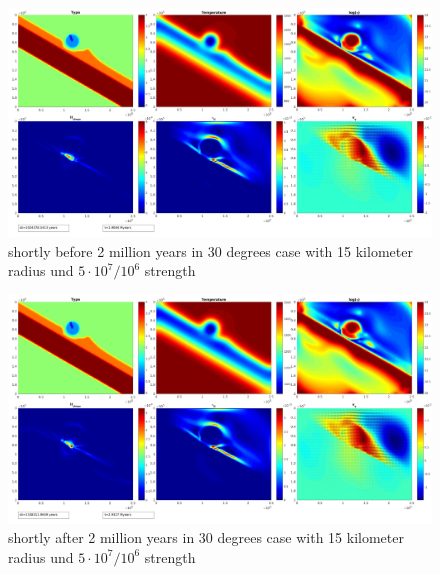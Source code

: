 \documentclass[12pt]{scrreprt}
\begin{document}
\begin{figure}[!ht]
\begin{minipage}[t]{1.0\textwidth}
\includegraphics[width=1.0\textwidth]{./Snapshots/bulldozer/posleft30/Subductionzonewithblob38posleft3slab30s5e7s1e6r15.jpg}
\end{minipage}
\caption{shortly before 2 million years in 30 degrees case with 15 kilometer radius und $5 \cdot10^7/10^6$ strength}
\label{fig:goodmatch1}
\end{figure}

\begin{figure}[!ht]
\begin{minipage}[t]{1.0\textwidth}
\includegraphics[width=1.0\textwidth]{./Snapshots/bulldozer/posleft30/Subductionzonewithblob39posleft3slab30s5e7s1e6r15.jpg}
\end{minipage}
\caption{shortly after 2 million years in 30 degrees case with 15 kilometer radius und $5 \cdot10^7/10^6$ strength}
\label{fig:goodmatch2}
\end{figure}
\end{document}
